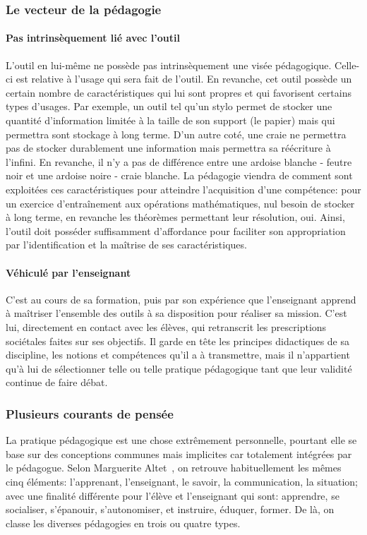         \subsubsection{Le vecteur de la pédagogie}
            \paragraph{Pas intrinsèquement lié avec l'outil}
                L'outil en lui-même ne possède pas intrinsèquement une visée pédagogique. Celle-ci est relative à l'usage qui sera fait de l'outil. En revanche, cet outil possède un certain nombre de caractéristiques qui lui sont propres et qui favorisent certains types d'usages. Par exemple, un outil tel qu'un stylo permet de stocker une quantité d'information limitée à la taille de son support (le papier) mais qui permettra sont
                stockage à long terme. D'un autre coté, une craie ne permettra pas de stocker durablement une information mais permettra sa réécriture à l'infini. En revanche, il n'y a pas de différence entre une ardoise blanche - feutre noir et une ardoise noire - craie blanche. La pédagogie viendra de comment sont exploitées ces caractéristiques pour atteindre l'acquisition d'une compétence: pour un exercice d'entraînement aux opérations mathématiques, nul besoin de stocker à long terme, en revanche les théorèmes permettant leur résolution, oui.
                Ainsi, l'outil doit posséder suffisamment d'affordance pour faciliter son appropriation par l'identification et la maîtrise de ses caractéristiques.
            \paragraph{Véhiculé par l'enseignant}
                C'est au cours de sa formation, puis par son expérience que l'enseignant apprend à maîtriser l'ensemble des outils à sa disposition pour réaliser sa mission. C'est lui, directement en contact avec les élèves, qui retranscrit les prescriptions sociétales faites sur ses objectifs. Il garde en tête les principes didactiques de sa discipline, les notions et compétences qu'il a à transmettre, mais il n'appartient qu'à lui de sélectionner telle ou telle pratique pédagogique tant que leur validité continue de faire débat.
        \subsubsection{Plusieurs courants de pensée}
            La pratique pédagogique est une chose extrêmement personnelle, pourtant elle se base sur des conceptions communes mais implicites car totalement intégrées par le pédagogue. Selon Marguerite Altet~, on retrouve habituellement les mêmes cinq éléments: l'apprenant, l'enseignant, le savoir, la communication, la situation; avec une finalité différente pour l'élève et l'enseignant qui sont: \Li apprendre, se socialiser, s'épanouir, s'autonomiser, et \ii instruire, éduquer, former. De là, on classe les diverses pédagogies en trois ou quatre types.
